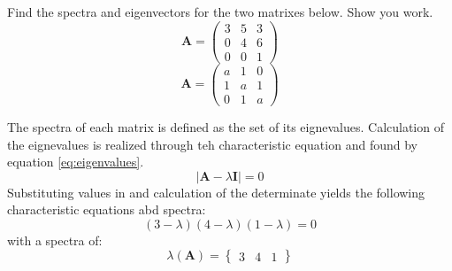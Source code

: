 Find the spectra and eigenvectors for the two matrixes below. Show you work.
\begin{equation*}\boldsymbol{A}=
	\begin{pmatrix}
		3&5&3\\0&4&6\\0&0&1
	\end{pmatrix}
\end{equation*}
\begin{equation*}
	\boldsymbol{A}=
	\begin{pmatrix}
		a&1&0\\1&a&1\\0&1&a
	\end{pmatrix}
\end{equation*}

The spectra of each matrix is defined as the set of its eignevalues. Calculation of the eignevalues is realized through teh characteristic equation and found by equation \ref{eq:eigenvalues}.
\begin{equation}
	\vert \boldsymbol{A}-\lambda\boldsymbol{I}\vert=0
	\label{eq:eigenvalues}
\end{equation}
Substituting values in and calculation of the determinate yields the following characteristic equations abd spectra:
\begin{equation*}
	\left(3-\lambda\right)\left(4-\lambda\right)\left(1-\lambda\right)=0
\end{equation*}
with a spectra of:
\begin{equation*}
	\lambda\left(\boldsymbol{A}\right)=
	\begin{Bmatrix}
		3&4&1
	\end{Bmatrix}
\end{equation*}
